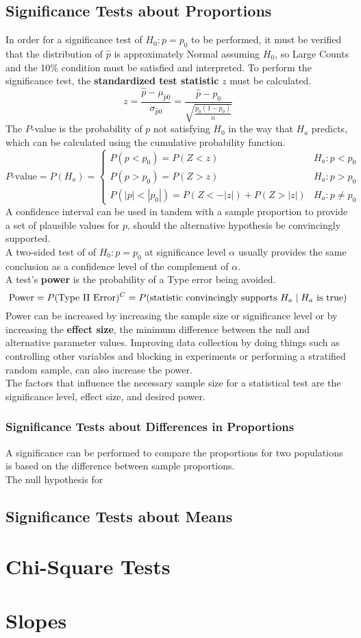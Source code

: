 \documentclass[../AP_Statistics.tex]{subfiles}
\begin{document}
		\section{Significance Tests about Proportions}
			In order for a significance test of $H_0:p = p_0$ to be performed, it must be verified that the distribution of $\hat{p}$ is approximately Normal assuming $H_0$, so Large Counts and the 10\% condition must be satisfied and interpreted.
			To perform the significance test, the \textbf{standardized test statistic} $z$ must be calculated. \\
			$$z = \frac{\hat{p} - \mu_{\hat{p}0}}{\sigma_{\hat{p}0}} = \frac{\hat{p} - p_0}{\sqrt{\frac{p_0(1 - p_0)}{n}}}$$
			The $P$-value is the probability of $p$ not satisfying $H_0$ in the way that $H_a$ predicts, which can be calculated using the cumulative probability function.
			$$
				P\text{-value} = P(H_a) = \begin{cases}
 					P(p < p_0) = P(Z < z) & H_a:p < p_0 \\
 					P(p > p_0) = P(Z > z) & H_a:p > p_0 \\
 					P(|p| < |p_0|) = P(Z < -|z|) + P(Z > |z|) & H_a:p \ne p_0
				\end{cases}
			$$
			A confidence interval can be used in tandem with a sample proportion to provide a set of plausible values for $p$, should the alternative hypothesis be convincingly supported. \\
			A two-sided test of of $H_0:p = p_0$ at significance level $\alpha$ usually provides the same conclusion as a confidence level of the complement of $\alpha$. \\
			A test's \textbf{power} is the probability of a Type  error being avoided.
			$$\mathrm{Power} = P(\text{Type \Roman{2} Error})^C = P(\text{statistic convincingly supports } H_a \mid H_a \text{ is true})$$
			Power can be increased by increasing the sample size or significance level or by increasing the \textbf{effect size}, the minimum difference between the null and alternative parameter values. Improving data collection by doing things such as controlling other variables and blocking in experiments or performing a stratified random sample, can also increase the power. \\
			The factors that influence the necessary sample size for a statistical test are the significance level, effect size, and desired power.
			\subsection*{Significance Tests about Differences in Proportions}
				A significance can be performed to compare the proportions for two populations is based on the difference between sample proportions. \\
				The null hypothesis for
		\section{Significance Tests about Means}
		\chapter{Chi-Square Tests}
	\chapter{Slopes}
\end{document}
